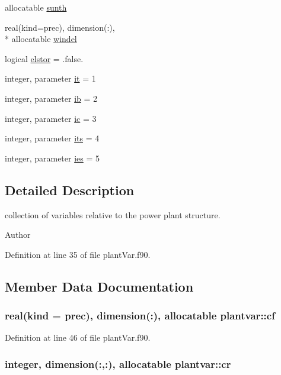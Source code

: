 \begin{DoxyCompactItemize}
allocatable \hyperlink{classplantvar_a1de4d45e17d60dcfca28b6bd17e74e05}{sunth}
\item 
real(kind=prec), dimension(\-:), \\*
allocatable \hyperlink{classplantvar_a90a77172411c06cf156d494ea2902bfd}{windel}
\item 
logical \hyperlink{classplantvar_a269d2dde89a5632bf0e3d0162c2368c0}{elstor} = .false.
\item 
integer, parameter \hyperlink{classplantvar_ae20b71682087261a45478790df439eb9}{it} = 1
\item 
integer, parameter \hyperlink{classplantvar_a234a52fa723b1234d3725b82c81dad0f}{ib} = 2
\item 
integer, parameter \hyperlink{classplantvar_a395505b74fbf30b4c496601cbd47a64b}{ic} = 3
\item 
integer, parameter \hyperlink{classplantvar_aaa8d59ae7b5ae7303a9b5bd17499ce56}{its} = 4
\item 
integer, parameter \hyperlink{classplantvar_afd5b160dbbf007015da33b4011f36c83}{ies} = 5
\end{DoxyCompactItemize}


\subsection{Detailed Description}
collection of variables relative to the power plant structure. \begin{DoxyAuthor}{Author}

\end{DoxyAuthor}


Definition at line 35 of file plant\-Var.\-f90.



\subsection{Member Data Documentation}
\hypertarget{classplantvar_af0df4533997b17a1fd69f0c152ce2804}{
\subsubsection[{cf}]{\setlength{\rightskip}{0pt plus 5cm}real(kind = prec), dimension(\-:), allocatable plantvar\-::cf}}\label{classplantvar_af0df4533997b17a1fd69f0c152ce2804}


Definition at line 46 of file plant\-Var.\-f90.

\hypertarget{classplantvar_a01620e31bb05f1443908f0bff75215a4}{
\subsubsection[{cr}]{\setlength{\rightskip}{0pt plus 5cm}integer, dimension(\-:,\-:), allocatable plantvar\-::cr}}\label{classplantvar_a01620e31bb05f1443908f0bff75215a4}


